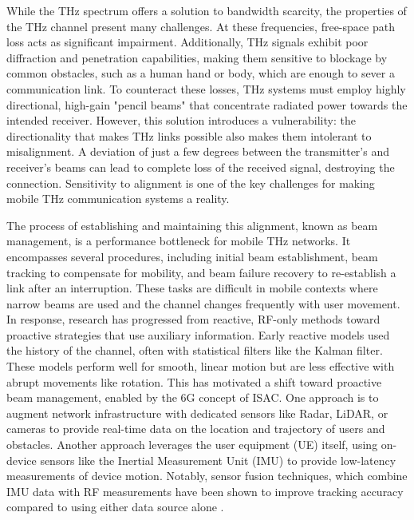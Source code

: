 \documentclass[fleqn,10pt]{wlscirep}
\begin{document}
While the THz spectrum offers a solution to bandwidth scarcity, the properties of the THz channel present many challenges. At these frequencies, free-space path loss acts as significant impairment\cite{10422992, Yu2025Research, Kleine-Ostmann2011}. Additionally, THz signals exhibit poor diffraction and penetration capabilities, making them sensitive to blockage by common obstacles, such as a human hand or body, which are enough to sever a communication link\cite{10494372, Jornet2023}. To counteract these losses, THz systems must employ highly directional, high-gain "pencil beams" that concentrate radiated power towards the intended receiver\cite{Kleine-Ostmann2011}. However, this solution introduces a vulnerability: the directionality that makes THz links possible also makes them intolerant to misalignment. A deviation of just a few degrees between the transmitter's and receiver's beams can lead to complete loss of the received signal, destroying the connection. Sensitivity to alignment is one of the key challenges for making mobile THz communication systems a reality\cite{10036372, Petrov2023Mobile, Azari2022}.

The process of establishing and maintaining this alignment, known as beam management, is a performance bottleneck for mobile THz networks. It encompasses several procedures, including initial beam establishment, beam tracking to compensate for mobility, and beam failure recovery to re-establish a link after an interruption\cite{Giordani2018ATO, 10422712, Wang2022}. These tasks are difficult in mobile contexts where narrow beams are used and the channel changes frequently with user movement\cite{9536953, smartcities8040105}. In response, research has progressed from reactive, RF-only methods toward proactive strategies that use auxiliary information. Early reactive models used the history of the channel, often with statistical filters like the Kalman filter\cite{8455289,9145366,10067030, 10123123}. These models perform well for smooth, linear motion but are less effective with abrupt movements like rotation\cite{Wang2022}. This has motivated a shift toward proactive beam management, enabled by the 6G concept of ISAC\cite{10494372, Azari2022, Nokia2022, Chen2023, Jornet2023}. One approach is to augment network infrastructure with dedicated sensors like Radar, LiDAR, or cameras to provide real-time data on the location and trajectory of users and obstacles\cite{10422712,5GPPP_Automotive_Vision_2015}. Another approach leverages the user equipment (UE) itself, using on-device sensors like the Inertial Measurement Unit (IMU) to provide low-latency measurements of device motion. Notably, sensor fusion techniques, which combine IMU data with RF measurements have been shown to improve tracking accuracy compared to using either data source alone \cite{10036372,9391649,electronics8020142, s21082723, 9814507}.
  
\end{document}
